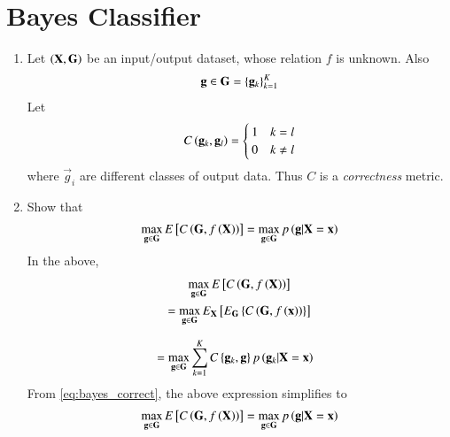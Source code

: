 \documentclass[journal,12pt,twocolumn]{IEEEtran}
\renewcommand\thesection{\arabic{section}}
\begin{document}
\section{Bayes Classifier}
\begin{enumerate}[label=\thesection.\arabic*
,ref=\thesection.\theenumi]
\item Let $\left(\mathbf{X},\mathbf{G}\right)$ be an input/output dataset, whose relation $f$ is unknown. Also
\begin{align}
\mathbf{g}\in\mathbf{G} = \left\{\mathbf{g}_k\right\}_{k=1}^{K}
\end{align}
Let 
\begin{align}
\label{eq:bayes_correct}
C\left(\mathbf{g}_k,\mathbf{g}_l\right) =
\begin{cases}
1 & k= l
\\
0 & k\ne l
\end{cases}
\end{align}
%
where $\vec{g}_i$ are different classes of output data. Thus $C$ is a {\em correctness} metric.
\item Show that 
\begin{align}
\max_{\mathbf{g}\in\mathbf{G}}E{}\left[C\left(\mathbf{G},f\left(\mathbf{X}\right)\right)\right] 
= \max_{\mathbf{g}\in\mathbf{G}}p\left(\mathbf{g}|\mathbf{X}=\mathbf{x}\right) 
\end{align}
\solution In the above, 
\begin{multline}
\max_{\mathbf{g}\in\mathbf{G}}E{}\left[C\left(\mathbf{G},f\left(\mathbf{X}\right)\right)\right] 
\\
= \max_{\mathbf{g}\in\mathbf{G}}E_\mathbf{X}{}\left[E_{\mathbf{G}}\left\{C\left(\mathbf{G},f\left(\mathbf{x}\right)\right)\right\}\right] 
\end{multline}

\begin{align}
&=\max_{\mathbf{g}\in\mathbf{G}}\sum_{k=1}^{K}C\left\{\mathbf{g}_k,\mathbf{g}\right\}p\left(\mathbf{g}_k|\mathbf{X}=\mathbf{x}\right) 
\end{align}
From \eqref{eq:bayes_correct}, the above expression simplifies to
\begin{align}
\max_{\mathbf{g}\in\mathbf{G}}E{}\left[C\left(\mathbf{G},f\left(\mathbf{X}\right)\right)\right] =\max_{\mathbf{g}\in\mathbf{G}}p\left(\mathbf{g}|\mathbf{X}=\mathbf{x}\right) 
\end{align}

\end{enumerate}
\end{document}
